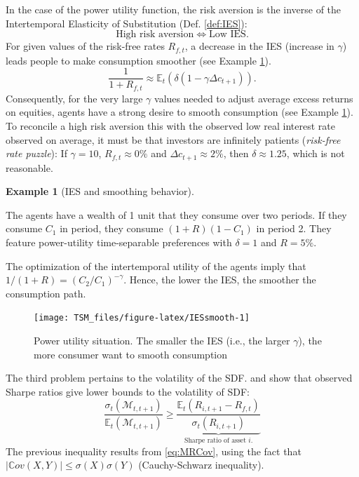 \documentclass[
  12pt,
]{book}
\theoremstyle{definition}
\theoremstyle{definition}
\newtheorem{example}{Example}[chapter]
\theoremstyle{definition}
\theoremstyle{definition}
\theoremstyle{remark}
\begin{document}
In the case of the power utility function, the risk aversion is the inverse of the Intertemporal Elasticity of Substitution (Def. \ref{def:IES}):
\[
\mbox{High risk aversion} \Leftrightarrow \mbox{Low IES}.
\]
For given values of the risk-free rates \(R_{f,t}\), a decrease in the IES (increase in \(\gamma\)) leads people to make consumption smoother (see Example \ref{exm:IESsmoothing}).
\[
\frac{1}{1+R_{f,t}} \approx \mathbb{E}_t(\delta (1 - \gamma \Delta c_{t+1})).
\]
Consequently, for the very large \(\gamma\) values needed to adjust average excess returns on equities, agents have a strong desire to smooth consumption (see Example \ref{exm:IESsmoothing}). To reconcile a high risk aversion this with the observed low real interest rate observed on average, it must be that investors are infinitely patients (\emph{risk-free rate puzzle}):
If \(\gamma=10\), \(R_{f,t} \approx 0\%\) and \(\Delta c_{t+1} \approx 2\%\), then \(\delta \approx 1.25\), which is not reasonable.

\begin{example}[IES and smoothing behavior]
\protect\hypertarget{exm:IESsmoothing}{}\label{exm:IESsmoothing}

The agents have a wealth of 1 unit that they consume over two periods. If they consume \(C_1\) in period, they consume \((1+R)(1-C_1)\) in period 2. They feature power-utility time-separable preferences with \(\delta=1\) and \(R=5\%\).

The optimization of the intertemporal utility of the agents imply that \(1/(1+R)=(C_2/C_1)^{-\gamma}\). Hence, the lower the IES, the smoother the consumption path.

\begin{figure}
\texttt{[image: TSM\_files/figure-latex/IESsmooth-1]} \caption{Power utility situation. The smaller the IES (i.e., the larger $\gamma$), the more consumer want to smooth consumption}\label{fig:IESsmooth}
\end{figure}

\end{example}

The third problem pertains to the volatility of the SDF. \citet{Grossman_Shiller_1981} and \citet{Hansen_Jagannathan_1991} show that observed Sharpe ratios give lower bounds to the volatility of SDF:
\[
\frac{\sigma_t(\mathcal{M}_{t,t+1})}{\mathbb{E}_t(\mathcal{M}_{t,t+1})} \ge \underbrace{\frac{\mathbb{E}_t(R_{i,t+1}-R_{f,t})}{\sigma_t(R_{i,t+1})}}_{\mbox{Sharpe ratio of asset $i$.}}
\]
The previous inequality results from \eqref{eq:MRCov}, using the fact that \(|\mathbb{C}ov(X,Y)| \le \sigma(X)\sigma(Y)\) (Cauchy-Schwarz inequality).
\end{document}
